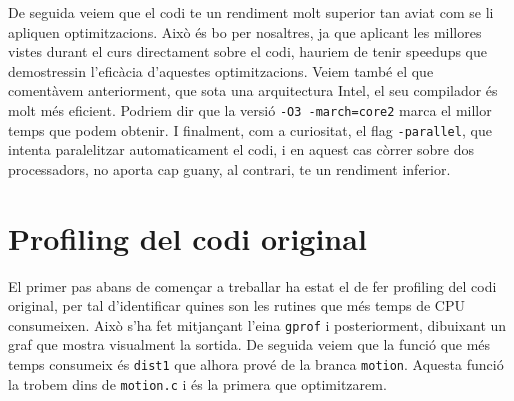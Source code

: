 De seguida veiem que el codi te un rendiment molt superior tan aviat com se li apliquen optimitzacions. Això és bo per nosaltres, ja que aplicant les millores vistes durant el curs directament sobre el codi, hauriem de tenir speedups que demostressin l'eficàcia d'aquestes optimitzacions.
Veiem també el que comentàvem anteriorment, que sota una arquitectura Intel, el seu compilador és molt més eficient. Podriem dir que la versió \texttt{-O3 -march=core2} marca el millor temps que podem obtenir.
I finalment, com a curiositat, el flag \texttt{-parallel}, que intenta paralelitzar automaticament el codi, i en aquest cas còrrer sobre dos processadors, no aporta cap guany, al contrari, te un rendiment inferior.

\section{Profiling del codi original}

El primer pas abans de començar a treballar ha estat el de fer profiling del codi original, per tal d'identificar quines son les rutines que més temps de CPU consumeixen. Això s'ha fet mitjançant l'eina \texttt{gprof} i posteriorment, dibuixant un graf que mostra visualment la sortida. De seguida veiem que la funció que més temps consumeix és \texttt{dist1} que alhora prové de la branca \texttt{motion}. Aquesta funció la trobem dins de \texttt{motion.c} i és la primera que optimitzarem.

